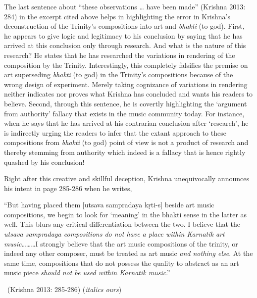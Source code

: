 The last sentence about “these observations … have been made” (Krishna 2013: 284) in the excerpt cited above helps in highlighting the error in Krishna’s deconstruction of the Trinity’s compositions into art and \textit{bhakti} (to god). First, he appears to give logic and legitimacy to his conclusion by saying that he has arrived at this conclusion only through research. And what is the nature of this research? He states that he has researched the variations in rendering of the composition by the Trinity. Interestingly, this completely falsifies the premise on art superseding \textit{bhakti} (to god) in the Trinity’s compositions because of the wrong design of experiment. Merely taking cognizance of variations in rendering neither indicates nor proves what Krishna has concluded and wants his readers to believe. Second, through this sentence, he is covertly highlighting the ‘argument from authority’ fallacy that exists in the music community today. For instance, when he says that he has arrived at his contrarian conclusion after ‘research’, he is indirectly urging the readers to infer that the extant approach to these compositions from \textit{bhakti} (to god) point of view is not a product of research and thereby stemming from authority which indeed is a fallacy that is hence rightly quashed by his conclusion!

Right after this creative and skillful deception, Krishna unequivocally announces his intent in page 285-286 when he writes,

\begin{myquote}
“But having placed them [utsava sampradaya kṛti-s] beside art music compositions, we begin to look for ‘meaning’ in the bhakti sense in the latter as well. This blurs any critical differentiation between the two. I believe that the \textit{utsava sampradaya compositions do not have a place within Karnatik art music}………I strongly believe that the art music compositions of the trinity, or indeed any other composer, must be treated as art music \textit{and nothing else}. At the same time, compositions that do not possess the quality to abstract as an art music piece \textit{should not be used within Karnatik music}.” 

~\hfill (Krishna 2013: 285-286) (\textit{italics ours})
\end{myquote}


